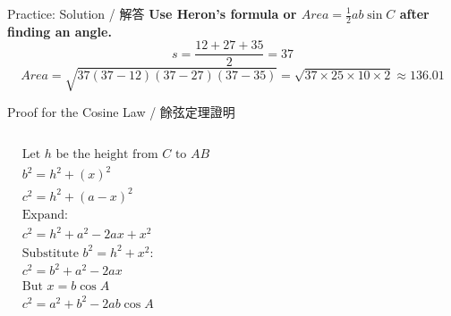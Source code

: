 \documentclass[aspectratio=169]{beamer}
\begin{document}
\begin{frame}{Practice: Solution / 解答}
    \footnotesize
    \textbf{Use Heron's formula or $Area = \frac{1}{2}ab\sin C$ after finding an angle.}
    \[
        s = \frac{12+27+35}{2} = 37
    \]
    \[
        Area = \sqrt{37(37-12)(37-27)(37-35)} = \sqrt{37 \times 25 \times 10 \times 2} \approx 136.01
    \]
\end{frame}

\begin{frame}{Proof for the Cosine Law / 餘弦定理證明}
    \begin{tcolorbox}[colback=lightgray,colframe=primary,title=Proof Sketch]
        \footnotesize
        \begin{columns}
            \begin{align*}
                &\text{Let $h$ be the height from $C$ to $AB$} \\
                &b^2 = h^2 + (x)^2 \\
                &c^2 = h^2 + (a-x)^2 \\
                &\text{Expand:} \\
                &c^2 = h^2 + a^2 - 2ax + x^2 \\
                &\text{Substitute $b^2 = h^2 + x^2$:} \\
                &c^2 = b^2 + a^2 - 2ax \\
                &\text{But $x = b\cos A$} \\
                &c^2 = a^2 + b^2 - 2ab\cos A
            \end{align*}
        \end{columns}
    \end{tcolorbox}
\end{frame}
\end{document}
